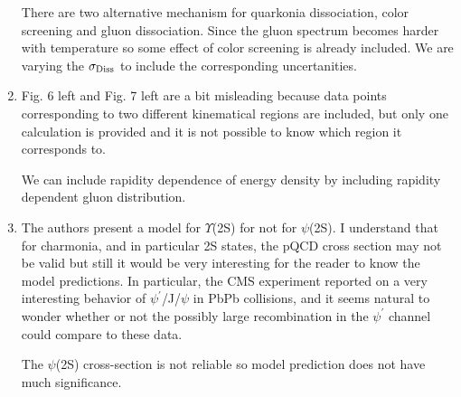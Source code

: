 \documentclass[aps,prc,preprint,superscriptaddress,showpacs,showkeys]{revtex4-1}
\begin{document}
\begin{enumerate}
{ \color{blue} There are two alternative mechanism for quarkonia dissociation, color screening
and gluon dissociation. Since the gluon spectrum becomes harder with temperature so some effect of color screening is
already included. We are varying the $\sigma_{\rm Diss}$ to include the corresponding uncertanities.}




\item { \color{red} Fig. 6 left and Fig. 7 left are a bit misleading because data points
corresponding to two different kinematical regions are included, but
only one calculation is provided and it is not possible to know which
region it corresponds to.}

{ \color{blue} 
We can include rapidity dependence of energy density by including rapidity dependent
gluon distribution.
}

\item { \color{red} The authors present a model for $\Upsilon$(2S) for not for $\psi$(2S). I
understand that for charmonia, and in particular 2S states, the pQCD
cross section may not be valid but still it would be very interesting
for the reader to know the model predictions. In particular, the CMS
experiment reported on a very interesting behavior of $\psi^{'}$/J/$\psi$ in
PbPb collisions, and it seems natural to wonder whether or not the
possibly large recombination in the $\psi^{'}$ channel could compare to
these data.}

{ \color{blue}   The $\psi$(2S) cross-section is not reliable so model prediction does not have much significance. }
\end{enumerate}
\end{document}
